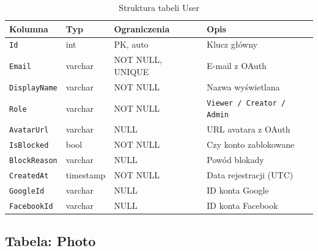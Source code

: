 \documentclass[12pt, a4paper]{article}
\begin{document}
\begin{table}[H]
  \centering
  \caption{Struktura tabeli User}
  \begin{tabular}{@{}L{3.5cm}L{2.5cm}L{2.5cm}L{5cm}@{}}
    \toprule
    \textbf{Kolumna} & \textbf{Typ} & \textbf{Ograniczenia} & \textbf{Opis} \\
    \midrule
    \texttt{Id}          & int       & PK, auto     & Klucz główny \\
    \texttt{Email}       & varchar   & NOT NULL, UNIQUE & E-mail z OAuth \\
    \texttt{DisplayName} & varchar   & NOT NULL     & Nazwa wyświetlana \\
    \texttt{Role}        & varchar   & NOT NULL     & \texttt{Viewer / Creator / Admin} \\
    \texttt{AvatarUrl}   & varchar   & NULL         & URL avatara z OAuth \\
    \texttt{IsBlocked}   & bool      & NOT NULL     & Czy konto zablokowane \\
    \texttt{BlockReason} & varchar   & NULL         & Powód blokady \\
    \texttt{CreatedAt}   & timestamp & NOT NULL     & Data rejestracji (UTC) \\
    \texttt{GoogleId}    & varchar   & NULL         & ID konta Google \\
    \texttt{FacebookId}  & varchar   & NULL         & ID konta Facebook \\
    \bottomrule
  \end{tabular}
\end{table}

\subsection{Tabela: Photo}
\end{document}
